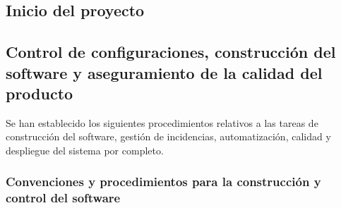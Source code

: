 \documentclass[12pt, a4paper, titlepage]{article}
\begin{document}
\subsection{Inicio del proyecto}

\subsection{Control de configuraciones, construcción del software y aseguramiento de la calidad del producto}

Se han establecido los siguientes procedimientos relativos a las tareas de construcción del software, gestión de incidencias, automatización,  calidad y despliegue del sistema por completo.

\subsubsection{Convenciones y procedimientos para la construcción y control del software}
\end{document}

